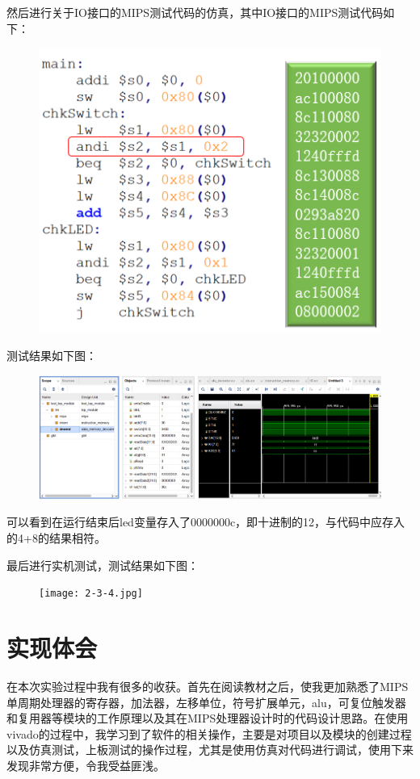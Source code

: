 \documentclass[UTF8]{article}
\begin{document}
\begin{enumerate}
			\par 然后进行关于IO接口的MIPS测试代码的仿真，其中IO接口的MIPS测试代码如下：
			\begin{figure}[htbp]
				\centering
				\includegraphics[scale=1]{2-3-2.png}
			\end{figure}
			\par 测试结果如下图：
			\begin{figure}[htbp]
				\centering
				\includegraphics[scale=0.4]{2-3-3.png}
			\end{figure}
			\par 可以看到在运行结束后led变量存入了0000000c，即十进制的12，与代码中应存入的4+8的结果相符。
			
			\par 最后进行实机测试，测试结果如下图：
			\begin{figure}[htbp]
				\centering
				\texttt{[image: 2-3-4.jpg]}
			\end{figure}
	\end{enumerate}
	\section{实现体会}
	\par 在本次实验过程中我有很多的收获。首先在阅读教材之后，使我更加熟悉了MIPS单周期处理器的寄存器，加法器，左移单位，符号扩展单元，alu，可复位触发器和复用器等模块的工作原理以及其在MIPS处理器设计时的代码设计思路。在使用vivado的过程中，我学习到了软件的相关操作，主要是对项目以及模块的创建过程以及仿真测试，上板测试的操作过程，尤其是使用仿真对代码进行调试，使用下来发现非常方便，令我受益匪浅。
\end{document}
